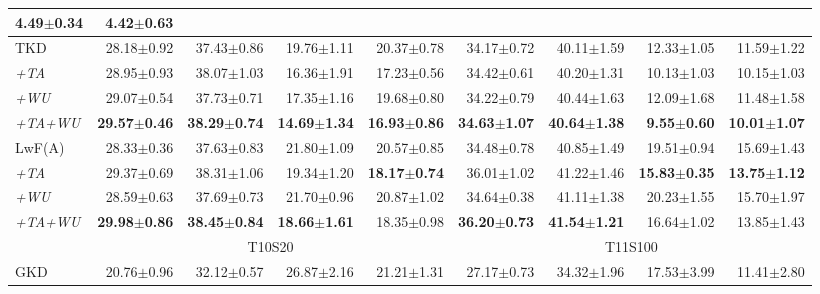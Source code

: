 \begin{appendix}
\begin{table*}[!th]
{\begin{tabular}{lrrrrrrrr}
  4.49$\pm$0.34 &
  4.42$\pm$0.63 \\ \midrule
TKD &
  28.18$\pm$0.92 &
  37.43$\pm$0.86 &
  19.76$\pm$1.11 &
  20.37$\pm$0.78 &
  34.17$\pm$0.72 &
  40.11$\pm$1.59 &
  12.33$\pm$1.05 &
  11.59$\pm$1.22 \\
\textit{+TA} &
  28.95$\pm$0.93 &
  38.07$\pm$1.03 &
  16.36$\pm$1.91 &
  17.23$\pm$0.56 &
  34.42$\pm$0.61 &
  40.20$\pm$1.31 &
  10.13$\pm$1.03 &
  10.15$\pm$1.03 \\
\textit{+WU} &
  29.07$\pm$0.54 &
  37.73$\pm$0.71 &
  17.35$\pm$1.16 &
  19.68$\pm$0.80 &
  34.22$\pm$0.79 &
  40.44$\pm$1.63 &
  12.09$\pm$1.68 &
  11.48$\pm$1.58 \\
\textit{+TA+WU} &
  \textbf{29.57$\pm$0.46} &
  \textbf{38.29$\pm$0.74} &
  \textbf{14.69$\pm$1.34} &
  \textbf{16.93$\pm$0.86} &
  \textbf{34.63$\pm$1.07} &
  \textbf{40.64$\pm$1.38} &
  \textbf{9.55$\pm$0.60} &
  \textbf{10.01$\pm$1.07} \\ \midrule
LwF(A) &
  28.33$\pm$0.36 &
  37.63$\pm$0.83 &
  21.80$\pm$1.09 &
  20.57$\pm$0.85 &
  34.48$\pm$0.78 &
  40.85$\pm$1.49 &
  19.51$\pm$0.94 &
  15.69$\pm$1.43 \\
\textit{+TA} &
  29.37$\pm$0.69 &
  38.31$\pm$1.06 &
  19.34$\pm$1.20 &
  \textbf{18.17$\pm$0.74} &
  36.01$\pm$1.02 &
  41.22$\pm$1.46 &
  \textbf{15.83$\pm$0.35} &
  \textbf{13.75$\pm$1.12} \\
\textit{+WU} &
  28.59$\pm$0.63 &
  37.69$\pm$0.73 &
  21.70$\pm$0.96 &
  20.87$\pm$1.02 &
  34.64$\pm$0.38 &
  41.11$\pm$1.38 &
  20.23$\pm$1.55 &
  15.70$\pm$1.97 \\
\textit{+TA+WU} &
  \textbf{29.98$\pm$0.86} &
  \textbf{38.45$\pm$0.84} &
  \textbf{18.66$\pm$1.61} &
  18.35$\pm$0.98 &
  \textbf{36.20$\pm$0.73} &
  \textbf{41.54$\pm$1.21} &
  16.64$\pm$1.02 &
  13.85$\pm$1.43 \\ \midrule
 &
  \multicolumn{4}{c}{T10S20} &
  \multicolumn{4}{c}{T11S100} \\ 
  \midrule
GKD &
  20.76$\pm$0.96 &
  32.12$\pm$0.57 &
  26.87$\pm$2.16 &
  21.21$\pm$1.31 &
  27.17$\pm$0.73 &
  34.32$\pm$1.96 &
  17.53$\pm$3.99 &
  11.41$\pm$2.80 \\

\end{tabular}}
\end{table*}
\end{appendix}
